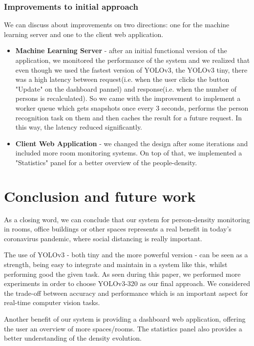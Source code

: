 \documentclass[runningheads,a4paper,11pt]{report}
\begin{document}
\subsection{Improvements to initial approach}
We can discuss about improvements on two directions: one for the machine learning server and one to the client web application.
\begin{itemize}
    \item \textbf{Machine Learning Server} - after an initial functional version of the application, we monitored the performance of the system and we realized that even though we used the fastest version of YOLOv3, the YOLOv3 tiny, there was a high latency between request(i.e. when the user clicks the button "Update" on the dashboard pannel) and response(i.e. when the number of persons is recalculated). So we came with the improvement to implement a worker queue which gets snapshots once every 3 seconds, performs the person recognition task on them and then caches the result for a future request. In this way, the latency reduced significantly. 
    \item \textbf{Client Web Application} - we changed the design after some iterations and included more room monitoring systems. On top of that, we implemented a "Statistics" panel for a better overview of the people-density.
\end{itemize}


\chapter{Conclusion and future work}
\label{chapter:concl}

As a closing word, we can conclude that our system for person-density monitoring in rooms, office buildings or other spaces represents a real benefit in today's coronavirus pandemic, where social distancing is really important. 

The use of YOLOv3 - both tiny and the more powerful version - can be seen as a strength, being easy to integrate and maintain in a system like this, whilst performing good the given task. As seen during this paper, we performed more experiments in order to choose YOLOv3-320 as our final approach. We considered the trade-off between accuracy and performance which is an important aspect for real-time computer vision tasks. 

Another benefit of our system is providing a dashboard web application, offering the user an overview of more spaces/rooms. The statistics panel also provides a better understanding of the density evolution.
\end{document}
